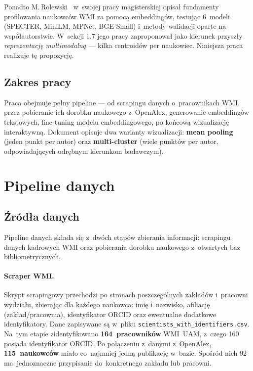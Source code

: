 \documentclass[a4paper,11pt]{article}
\begin{document}
Ponadto M.\,Rolewski~\cite{rolewski2024} w~swojej pracy magisterskiej opisał fundamenty profilowania naukowców WMI za pomocą embeddingów, testując 6~modeli (SPECTER, MiniLM, MPNet, BGE-Small) i~metody walidacji oparte na współautorstwie.
W~sekcji 1.7 jego pracy zaproponował jako kierunek przyszły \emph{reprezentację multimodalną} --- kilka centroidów per naukowiec.
Niniejsza praca realizuje tę propozycję.

\subsection{Zakres pracy}

Praca obejmuje pełny pipeline --- od scrapingu danych o~pracownikach WMI, przez pobieranie ich dorobku naukowego z~OpenAlex, generowanie embeddingów tekstowych, fine-tuning modelu embeddingowego, po końcową wizualizację interaktywną.
Dokument opisuje dwa warianty wizualizacji: \textbf{mean pooling} (jeden punkt per autor) oraz \textbf{multi-cluster} (wiele punktów per autor, odpowiadających odrębnym kierunkom badawczym).


\section{Pipeline danych}

\subsection{Źródła danych}

Pipeline danych składa się z~dwóch etapów zbierania informacji: scrapingu danych kadrowych WMI oraz pobierania dorobku naukowego z~otwartych baz bibliometrycznych.

\paragraph{Scraper WMI.}
Skrypt scrapingowy przechodzi po stronach poszczególnych zakładów i~pracowni wydziału, zbierając dla każdego naukowca: imię i~nazwisko, afiliację (zakład/pracownia), identyfikator ORCID oraz ewentualne dodatkowe identyfikatory.
Dane zapisywane są w~pliku \texttt{scientists\_with\_identifiers.csv}.
Na~tym etapie zidentyfikowano \textbf{164~pracowników} WMI~UAM, z~czego 160 posiada identyfikator ORCID.
Po połączeniu z~danymi z~OpenAlex, \textbf{115~naukowców} miało co~najmniej jedną publikację w~bazie.
Spośród nich 92 ma~jednoznaczne przypisanie do~konkretnego zakładu lub pracowni.
\end{document}
